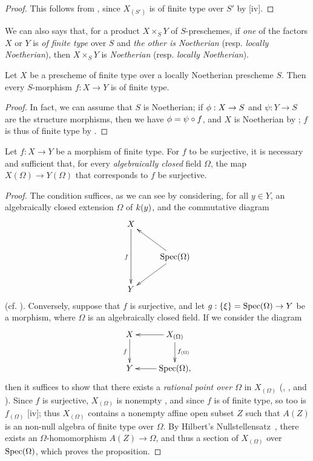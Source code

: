 \begin{proof}
This follows from , since $X_{(S')}$ is of finite type over $S'$ by [iv].
\end{proof}

We can also says that, for a product $X\times_S Y$ of $S$-preschemes, if \emph{one} of the factors
$X$ or $Y$ is \emph{of finite type} over $S$ and \emph{the other is Noetherian} (resp. \emph{locally Noetherian}), then $X\times_S Y$ is \emph{Noetherian} (resp. \emph{locally Noetherian}).

\begin{corollary}[6.3.9]
\label{I.6.3.9}
Let $X$ be a prescheme of finite type over a locally Noetherian prescheme $S$.
Then every $S$-morphism $f:X\to Y$ is of finite type.
\end{corollary}

\begin{proof}
In fact, we can assume that $S$ is Noetherian;
if $\vphi:X\to S$ and $\psi:Y\to S$ are the structure morphisms, then we have $\phi=\psi\circ f$, and $X$ is Noetherian by ;
$f$ is thus of finite type by .
\end{proof}

\begin{proposition}[6.3.10]
\label{I.6.3.10}
Let $f:X\to Y$ be a morphism of finite type.
For $f$ to be surjective, it is necessary and sufficient that, for every \emph{algebraically closed} field $\Omega$, the map $X(\Omega)\to Y(\Omega)$ that corresponds to $f$  be surjective.
\end{proposition}

\begin{proof}
The condition suffices, as we can see by considering, for all $y\in Y$, an algebraically closed extension $\Omega$ of $k(y)$, and the commutative diagram
\[
  \xymatrix{
    X\ar[dd]_f\\
    & \Spec(\Omega)\ar[ul]\ar[dl]\\
    Y
  }
\]
(cf. ).
Conversely, suppose that $f$ is surjective, and let $g:\{\xi\}=\Spec(\Omega)\to Y$ be a morphism, where $\Omega$ is an algebraically closed field.
If we consider the diagram
\[
  \xymatrix{
    X\ar[d]_f &
    X_{(\Omega)}\ar[l]\ar[d]^{f_{(\Omega)}}\\
    Y &
    \Spec(\Omega),\ar[l]
  }
\]
then it suffices to show that there exists a \emph{rational point over $\Omega$} in $X_{(\Omega)}$ (, , and ).
Since $f$ is surjective, $X_{(\Omega)}$ is nonempty , and since $f$ is of finite type, so too is $f_{(\Omega)}$ [iv];
thus $X_{(\Omega)}$ contains a nonempty affine open subset $Z$ such that $A(Z)$ is an non-null algebra of finite type over $\Omega$.
By Hilbert's Nullstellensatz~\cite{I-21}, there exists an $\Omega$-homomorphism $A(Z)\to\Omega$, and thus a section of $X_{(\Omega)}$ over $\operatorname{Spec}(\Omega)$, which proves the proposition.
\end{proof}

